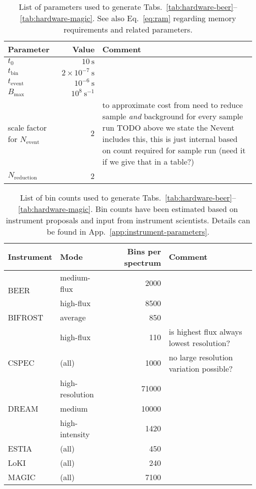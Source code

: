 \documentclass[a4paper,english,numbers=noenddot,bibliography=totoc,chapterprefix=on,DIV=12]{scrartcl}
\newcommand{\Tbin}{t_{\text{bin}}}
\newcommand{\Tevent}{t_{\text{event}}}
\newcommand{\Nevent}{N_{\text{event}}}
\newcommand{\Nreduction}{N_{\text{reduction}}}
\newcommand{\Bmax}{B_{\text{max}}}
\newcommand{\beer}{BEER\xspace}
\newcommand{\bifrost}{BIFROST\xspace}
\newcommand{\cspec}{CSPEC\xspace}
\newcommand{\dream}{DREAM\xspace}
\newcommand{\estia}{ESTIA\xspace}
\newcommand{\loki}{LoKI\xspace}
\newcommand{\magic}{MAGIC\xspace}
\begin{document}
\begin{table}
  \centering
  \begin{tabular}{lrp{8cm}}
    Parameter & Value & Comment\\
    \hline
    $t_0$ & $10~\mathrm{s}$ \\
    $\Tbin$ & $2\times10^{-7}~\mathrm{s}$ \\
    $\Tevent$ & $10^{-6}~\mathrm{s}$ \\
    $\Bmax$ & $10^8~\mathrm{s}^{-1}$ \\
    scale factor for $\Nevent$ & 2 & to approximate cost from need to reduce sample \emph{and} background for every sample run TODO above we state the Nevent includes this, this is just internal based on count required for sample run (need it if we give that in a table?) \\
    $\Nreduction$ & 2 \\
    \hline
  \end{tabular}
  \caption{\label{tab:hardware-estimation-parameters}
  List of parameters used to generate Tabs.~\ref{tab:hardware-beer}--\ref{tab:hardware-magic}.
  See also Eq.~\eqref{eq:ram} regarding memory requirements and related parameters.
}
\end{table}

\begin{table}
  \centering
  \begin{tabular}{llrl}
    Instrument & Mode & Bins per spectrum & Comment \\
    \hline
    \hline
    \multirow{2}{*}{\beer}
    & medium-flux & 2000 \\
    & high-flux & 8500 \\
    \hline
    \multirow{1}{*}{\bifrost}
    & average & 850\\
    & high-flux & 110 & is highest flux always lowest resolution?\\
    \hline
    \multirow{1}{*}{\cspec}
    & (all) & 1000 & no large resolution variation possible? \\
    \hline
    \multirow{3}{*}{\dream}
    & high-resolution & 71000 \\
    & medium & 10000 \\
    & high-intensity & 1420 \\
    \hline
    \multirow{1}{*}{\estia}
    & (all) & 450 \\
    \hline
    \multirow{1}{*}{\loki}
    & (all)    & 240 \\
    \hline
    \multirow{1}{*}{\magic}
    & (all) & 7100 \\
    \hline
  \end{tabular}
  \caption{\label{tab:resolution}
List of bin counts used to generate Tabs.~\ref{tab:hardware-beer}--\ref{tab:hardware-magic}.
Bin counts have been estimated based on instrument proposals and input from instrument scientists.
Details can be found in App.~\ref{app:instrument-parameters}.
}
\end{table}
\end{document}
